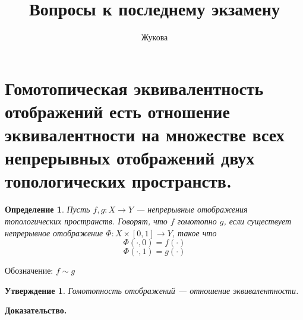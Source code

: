 \documentclass[a4paper]{article}
\author{Жукова}
\title{Вопросы к последнему экзамену}
\date{}
\newtheorem{defin}{Определение}
\newtheorem{prop}{Утверждение}
\begin{document}
\maketitle
\section{Гомотопическая эквивалентность отображений есть отношение
эквивалентности на множестве всех непрерывных отображений двух
топологических пространств.}
\begin{defin}
Пусть $f,g\colon X\to Y$ --- непрерывные отображения топологических
пространств. Говорят, что $f$ гомотопно  $g$, если существует непрерывное
отображение $\Phi\colon X\times [0,1]\to Y$, такое что
$$\Phi(\cdot ,0) = f(\cdot )$$
$$\Phi(\cdot ,1) = g(\cdot )$$
\end{defin}
Обозначение: $f\sim g$


\begin{prop}
Гомотопность отображений --- отношение эквивалентности.
\end{prop}
\textbf{Доказательство.}
\end{document}
